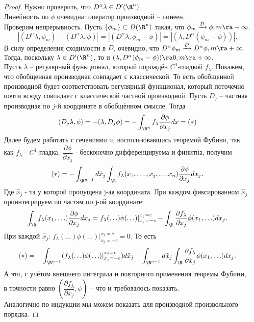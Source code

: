 \begin{proof}
    Нужно проверить, что $D^{\alpha}\lambda \in D'(\R^n)$. \\
    Линейность по $\phi$ очевидна: оператор производной -- линеен. \\
    Проверим непрерывность.
    Пусть $\{\phi_m\} \subset D(\R^n)$ такая, что $\phi_m \xrightarrow{D} \phi, m \ra +\infty$.
    \[
        |(D^{\alpha} \lambda, \phi_m) - (D^{\alpha} \lambda, \phi)| = |(D^{\alpha} \lambda, \phi_m - \phi)| = |(\lambda, D^{\alpha}(\phi_m - \phi))|.
    \]
    В силу определения сходимости в $D$, очевидно, что $D^{\alpha} \phi_m \xrightarrow{D} D^{\alpha} \phi, m \ra +\infty$.
    Тогда, поскольку $\lambda \in D'(\R^n)$, то и $(\lambda, D^{\alpha}(\phi_m - \phi)) \ra 0, m \ra +\infty$. \\
    Пусть $\lambda$ -- регулярный функционал, который порождён $C^1$-гладкой $f_\lambda$.
    Покажем, что обобщенная производная совпадает с классической. То есть обобщенной производной будет соответствовать регулярный функционал, который поточечно почти всюду совпадает с классической частной производной. Пусть $D_j$ -- частная производная по $j$-й координате в обобщённом смысле. Тогда
    \[
        (D_j \lambda, \phi) = -(\lambda, D_j \phi) = -\int_{\R^n} f_{\lambda} \dfrac{\partial \phi}{\partial x_j}dx = (*)
    \]
    Далее будем работать с сечениями и, воспользовавшись теоремой Фубини, так как $f_{\lambda}$ - $C^1$-гладка, $\dfrac{\partial \phi}{\partial x_j}$ - бесконечно дифференцируема и финитна, получим
    \[
        (*) = -\int_{\R^{n - 1}} d\hat{x}_j \int_{\R} f_{\lambda}(x_1, \ldots, x_j, \ldots x_n) \dfrac{\partial \phi}{\partial x_j} dx_j.
    \]
    Где $\hat{x}_j$ - та у которой пропущена j-ая координата. При каждом фиксированном $\hat{x}_j$ проинтегрируем по частям по j-ой координате:
    \[
        \int_{\R} f_{\lambda}(x_1, \ldots) \dfrac{\partial \phi}{\partial x_j} dx_j = f_{\lambda}(\ldots)\phi(\ldots)|^{x_j=c}_{x_j=-c} - \int_{\R} \dfrac{\partial f_{\lambda}}{\partial x_j} \phi(x_1, \ldots) dx_j.
    \]
    При каждой $\hat{x}_j$:  $f_{\lambda}(\ldots)\phi(\ldots)|^{x_j=c}_{x_j=-c} = 0$. То есть 
    \[
        (*) = -\int_{\R^{n - 1}} (f_{\lambda}(\ldots)\phi(\ldots)|^{x_j=c}_{x_j=-c}) d\hat{x}_j + \int_{\R^{n - 1}} d\hat{x}_j \int_{\R} \dfrac{\partial f_{\lambda}}{\partial x_j} \phi(x_1, \ldots) dx_j .
    \]
    А это, с учётом внешнего интеграла и повторного применения теоремы Фубини, в точности равно $(\dfrac{\partial f_{\lambda}}{\partial x_j}, \phi)$ -- что и требовалось показать. \\
    Аналогично по индукции мы можем показать для производной произвольного порядка.
\end{proof}
